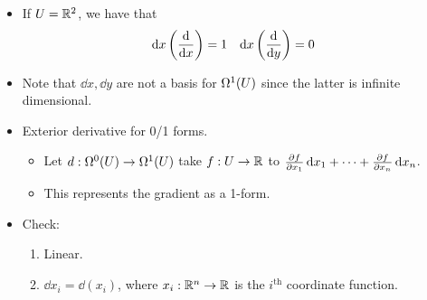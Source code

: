 \documentclass[../notes.tex]{subfiles}
\begin{document}
\begin{itemize}
    \item If $U=\R^2$, we have that
    \begin{align*}
        \dd{x}\left( \dv{x} \right) &= 1&
        \dd{x}\left( \dv{y} \right) &= 0
    \end{align*}
    \item Note that $\dd{x},\dd{y}$ are not a basis for $\ome[1]{U}$ since the latter is infinite dimensional.
    \item Exterior derivative for 0/1 forms.
    \begin{itemize}
        \item Let $d:\ome[0]{U}\to\ome[1]{U}$ take $f:U\to\R$ to $\pdv{f}{x_1}\dd{x_1}+\cdots+\pdv{f}{x_n}\dd{x_n}$.
        \item This represents the gradient as a 1-form.
    \end{itemize}
    \item Check:
    \begin{enumerate}
        \item Linear.
        \item $\dd{x_i}=\dd{(x_i)}$, where $x_i:\R^n\to\R$ is the $i^\text{th}$ coordinate function.
    \end{enumerate}
\end{itemize}
\end{document}
